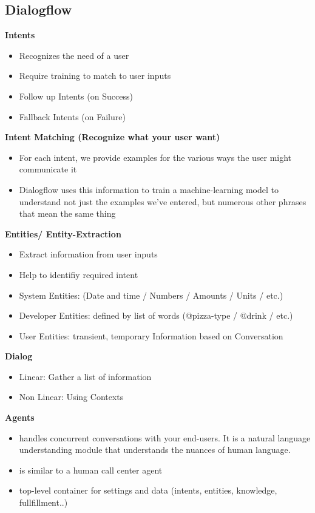\subsection{Dialogflow}
\textbf{Intents}
\begin{itemize}
    \item Recognizes the need of a user
    \item Require training to match to user inputs
    \item Follow up Intents (on Success)
    \item Fallback Intents (on Failure)
\end{itemize}
\textbf{Intent Matching (Recognize what your user want)}
\begin{itemize}
    \item For each intent, we provide examples for the various ways the user might communicate it
    \item Dialogflow uses this information to train a machine-learning model to understand not just the examples we've entered, but numerous other phrases that mean the same thing
\end{itemize}
\textbf{Entities/ Entity-Extraction}
\begin{itemize}
    \item Extract information from user inputs
    \item Help to identifiy required intent
    \item System Entities: (Date and time / Numbers / Amounts / Units / etc.)
    \item Developer Entities: defined by list of words (@pizza-type / @drink / etc.)
    \item User Entities: transient, temporary Information based on Conversation
\end{itemize}
\textbf{Dialog}
\begin{itemize}
    \item Linear: Gather a list of information
    \item Non Linear: Using Contexts
\end{itemize}
\textbf{Agents}
\begin{itemize}
    \item handles concurrent conversations with your end-users. It is a natural language understanding module that understands the nuances of human language. 
    \item is similar to a human call center agent
    \item top-level container for settings and data (intents, entities, knowledge, fullfillment..)
\end{itemize}

